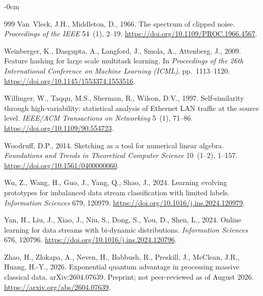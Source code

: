 \documentclass[sensors,article,submit,pdftex,moreauthors]{Definitions/mdpi}
\begin{document}
\begin{adjustwidth}{-\extralength}{0cm}
\begin{thebibliography}{999}
Van~Vleck, J.H., Middleton, D., 1966.
\newblock The spectrum of clipped noise.
\newblock \emph{Proceedings of the IEEE} 54~(1), 2--19.
\newblock \url{https://doi.org/10.1109/PROC.1966.4567}.

Weinberger, K., Dasgupta, A., Langford, J., Smola, A., Attenberg, J., 2009.
\newblock Feature hashing for large scale multitask learning.
\newblock In \emph{Proceedings of the 26th International Conference on Machine Learning (ICML)}, pp.~1113--1120.
\newblock \url{https://doi.org/10.1145/1553374.1553516}.

Willinger, W., Taqqu, M.S., Sherman, R., Wilson, D.V., 1997.
\newblock Self-similarity through high-variability: statistical analysis of Ethernet LAN traffic at the source level.
\newblock \emph{IEEE/ACM Transactions on Networking} 5~(1), 71--86.
\newblock \url{https://doi.org/10.1109/90.554723}.

Woodruff, D.P., 2014.
\newblock Sketching as a tool for numerical linear algebra.
\newblock \emph{Foundations and Trends in Theoretical Computer Science} 10~(1--2), 1--157.
\newblock \url{https://doi.org/10.1561/0400000060}.

Wu, Z., Wang, H., Guo, J., Yang, Q., Shao, J., 2024.
\newblock Learning evolving prototypes for imbalanced data stream classification with limited labels.
\newblock \emph{Information Sciences} 679, 120979.
\newblock \url{https://doi.org/10.1016/j.ins.2024.120979}.

Yan, H., Liu, J., Xiao, J., Niu, S., Dong, S., You, D., Shen, L., 2024.
\newblock Online learning for data streams with bi-dynamic distributions.
\newblock \emph{Information Sciences} 676, 120796.
\newblock \url{https://doi.org/10.1016/j.ins.2024.120796}.

Zhao, H., Zlokapa, A., Neven, H., Babbush, R., Preskill, J., McClean, J.R., Huang, H.-Y., 2026.
\newblock Exponential quantum advantage in processing massive classical data.
\newblock arXiv:2604.07639. Preprint; not peer-reviewed as of August 2026.
\newblock \url{https://arxiv.org/abs/2604.07639}.

\end{thebibliography}
\end{adjustwidth}
\end{document}
